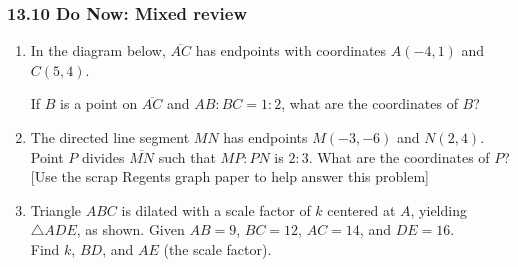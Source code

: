 \documentclass[12pt, twoside]{article}
\begin{document}
\subsubsection*{13.10 Do Now: Mixed review}
 \begin{enumerate}

  \item In the diagram below, $\overline{AC}$ has endpoints with coordinates $A(-4,1)$ and $C(5,4)$.
   \begin{center} %
   \end{center}
   If $B$ is a point on $\overline{AC}$ and $AB{:}BC = 1{:}2$,  what  are  the coordinates of $B$? \vspace{4cm}

   \item The directed line segment $MN$ has endpoints $M(-3,-6)$ and $N(2,4)$. Point $P$ divides $\overline{MN}$ such that $MP {:}PN$ is $2{:}3$. What are the coordinates of $P$?\\[0.25cm]
   [Use the scrap Regents graph paper to help answer this problem] \vspace{4cm}

\newpage
  \item Triangle $ABC$ is dilated with a scale factor of $k$ centered at $A$, yielding $\triangle ADE$, as shown. Given $AB=9$, $BC=12$, $AC=14$, and $DE=16$. \\[0.25cm] Find $k$, $BD$, and $AE$ (the scale factor).\\[0.25cm]
  \vspace{4cm}


\end{enumerate}
\end{document}
